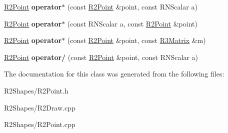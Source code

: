 \begin{DoxyCompactItemize}
\item 
\hyperlink{class_r2_point}{R2\+Point} {\bfseries operator$\ast$} (const \hyperlink{class_r2_point}{R2\+Point} \&point, const R\+N\+Scalar a)\hypertarget{class_r2_point_aaa5c822e637d8fef54cc89f2293d510e}{}\label{class_r2_point_aaa5c822e637d8fef54cc89f2293d510e}

\item 
\hyperlink{class_r2_point}{R2\+Point} {\bfseries operator$\ast$} (const R\+N\+Scalar a, const \hyperlink{class_r2_point}{R2\+Point} \&point)\hypertarget{class_r2_point_a9d1ae559ee6afdfb758dd19f995a9d19}{}\label{class_r2_point_a9d1ae559ee6afdfb758dd19f995a9d19}

\item 
\hyperlink{class_r2_point}{R2\+Point} {\bfseries operator$\ast$} (const \hyperlink{class_r2_point}{R2\+Point} \&point, const \hyperlink{class_r3_matrix}{R3\+Matrix} \&m)\hypertarget{class_r2_point_ac7529c22a6c56bfd40e4355f920d33ab}{}\label{class_r2_point_ac7529c22a6c56bfd40e4355f920d33ab}

\item 
\hyperlink{class_r2_point}{R2\+Point} {\bfseries operator/} (const \hyperlink{class_r2_point}{R2\+Point} \&point, const R\+N\+Scalar a)\hypertarget{class_r2_point_a0b79fc32fe00b031fb7ff6518b9a90d6}{}\label{class_r2_point_a0b79fc32fe00b031fb7ff6518b9a90d6}

\end{DoxyCompactItemize}


The documentation for this class was generated from the following files\+:\begin{DoxyCompactItemize}
\item 
R2\+Shapes/R2\+Point.\+h\item 
R2\+Shapes/R2\+Draw.\+cpp\item 
R2\+Shapes/R2\+Point.\+cpp\end{DoxyCompactItemize}

